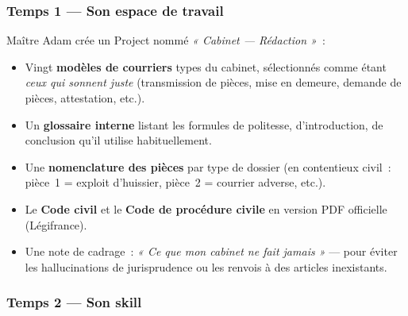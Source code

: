 \documentclass[11pt,a4paper]{article}
\newcommand{\bordsec}[1]{\subsubsection*{\textcolor{bordeaux}{#1}}}
\begin{document}
\bordsec{Temps 1 — Son espace de travail}

Maître Adam crée un Project nommé \textit{« Cabinet — Rédaction »}~:

\begin{workspacebox}
\begin{itemize}[leftmargin=1.2em]
  \item Vingt \textbf{modèles de courriers} types du cabinet, sélectionnés
        comme étant \textit{ceux qui sonnent juste} (transmission de pièces,
        mise en demeure, demande de pièces, attestation, etc.).
  \item Un \textbf{glossaire interne} listant les formules de politesse,
        d'introduction, de conclusion qu'il utilise habituellement.
  \item Une \textbf{nomenclature des pièces} par type de dossier (en
        contentieux civil~: pièce~1 = exploit d'huissier, pièce~2 = courrier
        adverse, etc.).
  \item Le \textbf{Code civil} et le \textbf{Code de procédure civile} en
        version PDF officielle (Légifrance).
  \item Une note de cadrage~: \textit{« Ce que mon cabinet ne fait jamais »}
        — pour éviter les hallucinations de jurisprudence ou les renvois
        à des articles inexistants.
\end{itemize}
\end{workspacebox}

\bordsec{Temps 2 — Son skill}
\end{document}
